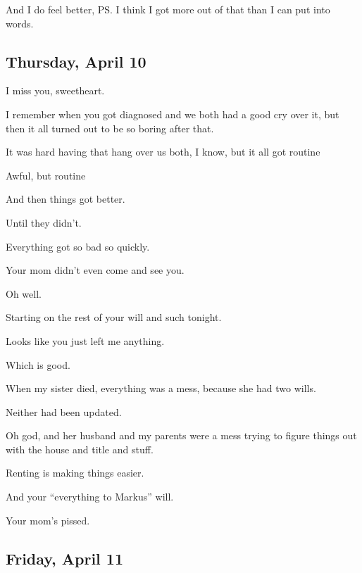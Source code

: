 { And I do feel better, PS. I think I got more out of that than I can put into words.

\newpage

\subsection*{Thursday, April 10}\label{thursday-april-10}

 I miss you, sweetheart.

 I remember when you got diagnosed and we both had a good cry over it, but then it all turned out to be so boring after that.

 It was hard having that hang over us both, I know, but it all got routine

 Awful, but routine

 And then things got better.

 Until they didn't.

 Everything got so bad so quickly.

 Your mom didn't even come and see you.

 Oh well.

 Starting on the rest of your will and such tonight.

 Looks like you just left me anything.

 Which is good.

 When my sister died, everything was a mess, because she had two wills.

 Neither had been updated.

 Oh god, and her husband and my parents were a mess trying to figure things out with the house and title and stuff.

 Renting is making things easier.

 And your ``everything to Markus'' will.

 Your mom's pissed.

\newpage

\subsection*{Friday, April 11}\label{friday-april-11}

}
